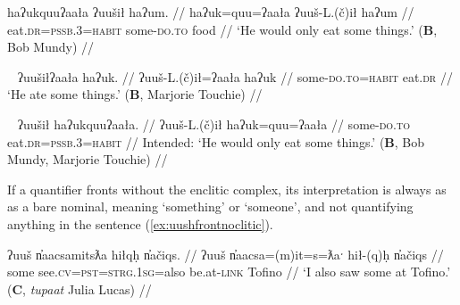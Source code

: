 \ex \label{ex:uushilnofront}
\begingl
\glpreamble haʔukquuʔaała ʔuušił haʔum. //
\gla haʔuk=quu=ʔaała ʔuuš-L.(č)ił haʔum //
\glb eat.\textsc{dr}=\textsc{pssb.3}=\textsc{habit} some-\textsc{do.to} food //
\glft `He would only eat some things.' (\textbf{B}, Bob Mundy) //
\endgl
\xe

\ex~ \label{ex:uushilfront}
\begingl
\glpreamble ʔuušiłʔaała haʔuk. //
\gla ʔuuš-L.(č)ił=ʔaała haʔuk  //
\glb some-\textsc{do.to}=\textsc{habit} eat.\textsc{dr} //
\glft `He ate some things.' (\textbf{B}, Marjorie Touchie) //
\endgl
\xe

\ex~ \label{*ex:uushilfront}
\begingl
\glpreamble *ʔuušił haʔukquuʔaała. //
\gla ʔuuš-L.(č)ił haʔuk=quu=ʔaała  //
\glb some-\textsc{do.to} eat.\textsc{dr}=\textsc{pssb.3}=\textsc{habit} //
\glft Intended: `He would only eat some things.' (\textbf{B}, Bob Mundy, Marjorie Touchie) //
\endgl
\xe

\begin{comment}
I have not done a deep investigation into the conditions that determine whether the second position complex falls on the fronted quantifier or on the following predicate. In fact, this may vary by quantifier type. I have examples in my data of the fronted quantifier \textit{ʔuuš} taking the clitics (\ref{ex:uushfrontclitic}) or not (\ref{ex:uushfrontnoclitic}).

\ex \label{ex:uushfrontclitic}
\begingl
\glpreamble k̓umaaw̓it̓asʔaƛquu, n̓aačukitʔišʔaałʔał ʔin hiłʔapitʔaałʔał suč̓as, \textbf{ʔuušʔaƛquu wiikapuƛ}. //
\gla k̓um-(y)aˑ-w̓it̓as=!aƛ=quu, n̓aačuk=(m)it=ʔiˑš=ʔaał=ʔał ʔin hił=!ap=(m)it=ʔaał=ʔał suč̓as, \textbf{ʔuuš=ʔaƛ=quu wiikapuƛ}  //
\glb point-\textsc{cv}-going.to=\textsc{now}=\textsc{pssb.3} look.\textsc{dr}=\textsc{pst}=\textsc{strg.3}=\textsc{habit}=\textsc{pl} \textsc{comp} be.at=\textsc{caus}=\textsc{pst}=\textsc{habit}=\textsc{pl} tree, \textbf{some=\textsc{now}=\textsc{pssb.3} pass.away.\textsc{mo}} //
\glft `If he is going to be pointer, they look to see if they put (someone) in a tree, if someone has passed away.' (\textbf{C}, \textit{tupaat} Julia Lucas) //
\endgl
\xe
\end{comment}

If a quantifier fronts without the enclitic complex, its interpretation is always as as a bare nominal, meaning `something' or `someone', and not quantifying anything in the sentence (\ref{ex:uushfrontnoclitic}).

\ex \label{ex:uushfrontnoclitic}
\begingl
\glpreamble ʔuuš n̓aacsamitsƛa hiłqḥ n̓ačiqs. //
\gla ʔuuš n̓aacsa=(m)it=s=ƛaˑ hił-(q)ḥ n̓ačiqs  //
\glb some see.\textsc{cv}=\textsc{pst}=\textsc{strg.1sg}=also be.at-\textsc{link} Tofino //
\glft `I also saw some at Tofino.' (\textbf{C}, \textit{tupaat} Julia Lucas) //
\endgl
\xe

